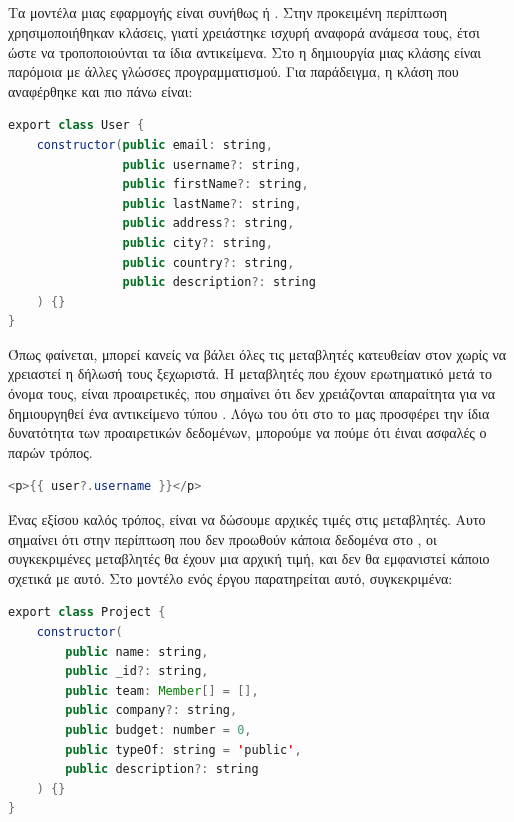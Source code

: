 \subsection*{}
\pSpace Τα μοντέλα μιας εφαρμογής είναι συνήθως  ή . Στην προκειμένη περίπτωση χρησιμοποιήθηκαν κλάσεις, γιατί χρειάστηκε ισχυρή αναφορά ανάμεσα τους, έτσι ώστε να τροποποιούνται τα ίδια αντικείμενα. Στο  η δημιουργία μιας κλάσης είναι παρόμοια με άλλες γλώσσες προγραμματισμού. Για παράδειγμα, η κλάση  που αναφέρθηκε και πιο πάνω είναι:\\
	\begin{lstlisting}[language=Java]
export class User {
    constructor(public email: string,
                public username?: string,
                public firstName?: string,
                public lastName?: string,
                public address?: string,
                public city?: string,
                public country?: string,
                public description?: string
    ) {}
}
	\end{lstlisting}
\pSpace Όπως φαίνεται, μπορεί κανείς να βάλει όλες τις μεταβλητές κατευθείαν στον  χωρίς να χρειαστεί η δήλωσή τους ξεχωριστά. Η μεταβλητές που έχουν ερωτηματικό μετά το όνομα τους, είναι προαιρετικές, που σημαίνει ότι δεν χρειάζονται απαραίτητα για να δημιουργηθεί ένα αντικείμενο τύπου . Λόγω του ότι στο  το  μας προσφέρει την ίδια δυνατότητα των προαιρετικών δεδομένων, μπορούμε να πούμε ότι έιναι ασφαλές ο παρών τρόπος.\\

	\begin{lstlisting}[language=Java]
<p>{{ user?.username }}</p>
	\end{lstlisting}

\pSpace Ένας εξίσου καλός τρόπος, είναι να δώσουμε αρχικές τιμές στις μεταβλητές. Αυτο σημαίνει ότι στην περίπτωση που δεν προωθούν κάποια δεδομένα στο , οι συγκεκριμένες μεταβλητές θα έχουν μια αρχική τιμή, και δεν θα εμφανιστεί κάποιο  σχετικά με αυτό. Στο μοντέλο ενός έργου παρατηρείται αυτό, συγκεκριμένα:\\

	\begin{lstlisting}[language=Java]
export class Project {
    constructor(
        public name: string,
        public _id?: string,
        public team: Member[] = [],
        public company?: string,
        public budget: number = 0,
        public typeOf: string = 'public',
        public description?: string
    ) {}
}
	\end{lstlisting}

